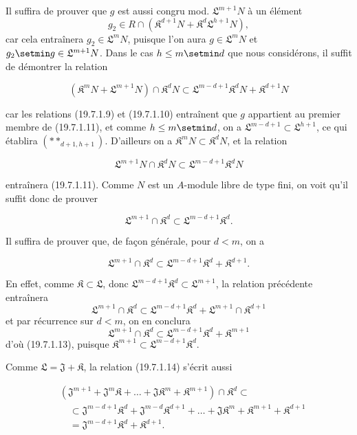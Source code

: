 Il suffira de prouver que $g$ est aussi congru mod. $\mathfrak L^{m+1}N$ à un élément
\[
  g_2\in R\cap(\mathfrak K^{d+1}N+\mathfrak K^d\mathfrak L^{h+1}N),
\]
car cela entraînera $g_2\in\mathfrak L^mN$, puisque l'on aura $g\in\mathfrak L^mN$ et $g_2\setmin g\in\mathfrak L^{m+1}N$. Dans le cas $h\leq m\setmin d$ que nous considérons, il suffit de démontrer la relation
\begin{env}[19.7.1.11]
\label{IV.19.7.1.11}
\[
  (\mathfrak K^mN+\mathfrak L^{m+1}N)\cap\mathfrak K^dN\subset\mathfrak L^{m-d+1}\mathfrak K^dN+\mathfrak K^{d+1}N
\]
\end{env}
car les relations (19.7.1.9) et (19.7.1.10) entraînent que $g$ appartient au premier membre de (19.7.1.11), et comme $h\leq m\setmin d$, on a $\mathfrak L^{m-d+1}\subset\mathfrak L^{h+1}$, ce qui établira $(**_{d+1,h+1})$. D'ailleurs on a $\mathfrak K^mN\subset\mathfrak K^dN$, et la relation
\begin{env}[19.7.1.12]
\label{IV.19.7.1.12}
\[
  \mathfrak L^{m+1}N\cap\mathfrak K^dN\subset\mathfrak L^{m-d+1}\mathfrak K^dN
\]
\end{env}
entraînera (19.7.1.11). Comme $N$ est un $A$-module libre de type fini, on voit qu'il suffit donc de prouver
\begin{env}[19.7.1.13]
\label{IV.19.7.1.13}
\[
  \mathfrak L^{m+1}\cap\mathfrak K^d\subset\mathfrak L^{m-d+1}\mathfrak K^d.
\]
\end{env}

Il suffira de prouver que, de façon générale, pour $d<m$, on a
\begin{env}[19.7.1.14]
\label{IV.19.7.1.14}
\[
  \mathfrak L^{m+1}\cap\mathfrak K^d\subset\mathfrak L^{m-d+1}\mathfrak K^d+\mathfrak K^{d+1}.
\]
\end{env}
En effet, comme $\mathfrak K\subset\mathfrak L$, donc $\mathfrak L^{m-d+1}\mathfrak K^d\subset\mathfrak L^{m+1}$, la relation précédente entraînera
\[
  \mathfrak L^{m+1}\cap\mathfrak K^d\subset\mathfrak L^{m-d+1}\mathfrak K^d+\mathfrak L^{m+1}\cap\mathfrak K^{d+1}
\]
et par récurrence sur $d<m$, on en conclura
\[
  \mathfrak L^{m+1}\cap\mathfrak K^d\subset\mathfrak L^{m-d+1}\mathfrak K^d+\mathfrak K^{m+1}
\]
d'où (19.7.1.13), puisque $\mathfrak K^{m+1}\subset\mathfrak L^{m-d+1}\mathfrak K^d$.

Comme $\mathfrak L=\mathfrak J+\mathfrak K$, la relation (19.7.1.14) s'écrit aussi
\begin{env}[19.7.1.15]
\label{IV.19.7.1.15}
\[
\begin{aligned}
  &(\mathfrak J^{m+1}+\mathfrak J^m\mathfrak K+\ldots+\mathfrak J\mathfrak K^m+\mathfrak K^{m+1})\cap\mathfrak K^d\subset\\
  &\quad\subset\mathfrak J^{m-d+1}\mathfrak K^d+\mathfrak J^{m-d}\mathfrak K^{d+1}+\ldots+\mathfrak J\mathfrak K^m+\mathfrak K^{m+1}+\mathfrak K^{d+1}\\
  &\quad=\mathfrak J^{m-d+1}\mathfrak K^d+\mathfrak K^{d+1}.
\end{aligned}
\]
\end{env}

